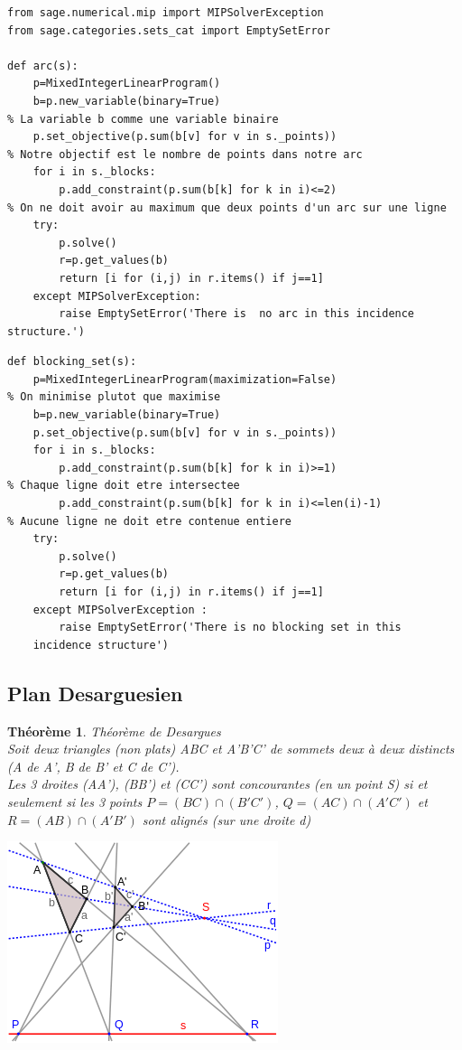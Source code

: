 \documentclass[a4paper]{article}
\newtheorem{Th}{Théorème}
\begin{document}
\begin{lstlisting}
from sage.numerical.mip import MIPSolverException
from sage.categories.sets_cat import EmptySetError
          
def arc(s):   
    p=MixedIntegerLinearProgram()
    b=p.new_variable(binary=True)
% La variable b comme une variable binaire
    p.set_objective(p.sum(b[v] for v in s._points))
% Notre objectif est le nombre de points dans notre arc
    for i in s._blocks:
        p.add_constraint(p.sum(b[k] for k in i)<=2)
% On ne doit avoir au maximum que deux points d'un arc sur une ligne 
    try:
        p.solve()
        r=p.get_values(b)
        return [i for (i,j) in r.items() if j==1]
    except MIPSolverException:
        raise EmptySetError('There is  no arc in this incidence structure.')
\end{lstlisting}
\newpage
\begin{lstlisting}
def blocking_set(s):
    p=MixedIntegerLinearProgram(maximization=False)
% On minimise plutot que maximise
    b=p.new_variable(binary=True)
    p.set_objective(p.sum(b[v] for v in s._points))
    for i in s._blocks:
        p.add_constraint(p.sum(b[k] for k in i)>=1)
% Chaque ligne doit etre intersectee
        p.add_constraint(p.sum(b[k] for k in i)<=len(i)-1)
% Aucune ligne ne doit etre contenue entiere
    try:
        p.solve()
        r=p.get_values(b)
        return [i for (i,j) in r.items() if j==1]
    except MIPSolverException :
        raise EmptySetError('There is no blocking set in this
    incidence structure')  
\end{lstlisting}


\subsection{Plan Desarguesien}

\begin{Th}{Th\'eor\`eme de Desargues}\\
  Soit deux triangles (non plats) ABC et A'B'C' de sommets deux à deux distincts (A de A', B de B' et C de C'). \\
  Les 3 droites (AA'), (BB') et (CC') sont concourantes (en un point S) si et seulement si les 3 points $P = (BC) \cap (B'C')$, $Q = (AC) \cap (A'C')$ et $R = (AB) \cap (A'B')$ sont alignés (sur une droite d)
  \end{Th}

\begin{center}
\includegraphics[scale=0.5]{desargues.png}  
\end{center}
\end{document}
